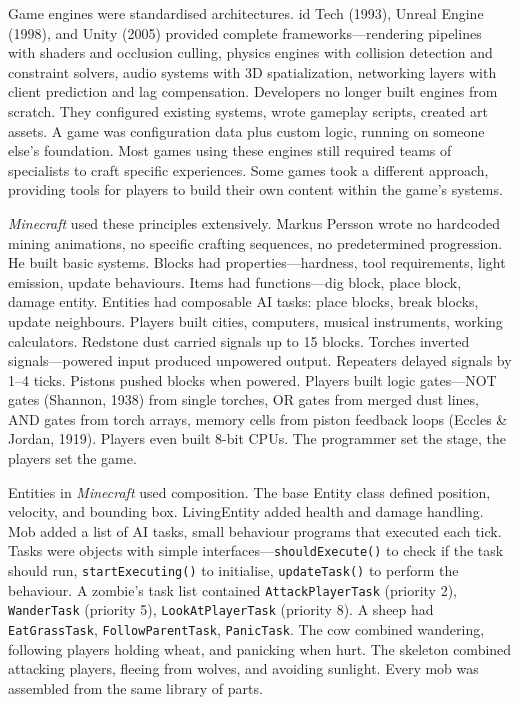 Game engines were standardised architectures. id Tech (1993), Unreal Engine (1998), and Unity (2005) provided complete frameworks—rendering pipelines with shaders and occlusion culling, physics engines with collision detection and constraint solvers, audio systems with 3D spatialization, networking layers with client prediction and lag compensation. Developers no longer built engines from scratch. They configured existing systems, wrote gameplay scripts, created art assets.  A game was configuration data plus custom logic, running on someone else's foundation. Most games using these engines still required teams of specialists to craft specific experiences. Some games took a different approach, providing tools for players to build their own content within the game's systems.

\emph{Minecraft} used these principles extensively. Markus Persson wrote no hardcoded mining animations, no specific crafting sequences, no predetermined progression. He built basic systems. Blocks had properties—hardness, tool requirements, light emission, update behaviours. Items had functions—dig block, place block, damage entity. Entities had composable AI tasks: place blocks, break blocks, update neighbours. Players built cities, computers, musical instruments, working calculators. Redstone dust carried signals up to 15 blocks. Torches inverted signals—powered input produced unpowered output. Repeaters delayed signals by 1–4 ticks. Pistons pushed blocks when powered. Players built logic gates—NOT gates (Shannon, 1938) from single torches, OR gates from merged dust lines, AND gates from torch arrays, memory cells from piston feedback loops (Eccles \& Jordan, 1919).  Players even built 8-bit CPUs. The programmer set the stage, the players set the game.

Entities in \emph{Minecraft} used composition. The base Entity class defined position, velocity, and bounding box. LivingEntity added health and damage handling. Mob added a list of AI tasks, small behaviour programs that executed each tick. Tasks were objects with simple interfaces—\texttt{shouldExecute()} to check if the task should run, \texttt{startExecuting()} to initialise, \texttt{updateTask()} to perform the behaviour. A zombie's task list contained \texttt{AttackPlayerTask} (priority 2), \texttt{WanderTask} (priority 5), \texttt{LookAtPlayerTask} (priority 8). A sheep had \texttt{EatGrassTask}, \texttt{FollowParentTask}, \texttt{PanicTask}.  The cow combined wandering, following players holding wheat, and panicking when hurt. The skeleton combined attacking players, fleeing from wolves, and avoiding sunlight. Every mob was assembled from the same library of parts.

